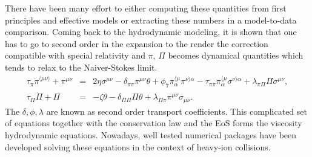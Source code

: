 There have been many effort to either computing these quantities from first principles and effective models or extracting these numbers in a model-to-data comparison.
Coming back to the hydrodynamic modeling, it is shown that one has to go to second order in the expansion to the render the correction compatible with special relativity and $\pi$, $\Pi$ becomes dynamical quantities which tends to relax to the Naiver-Stokes limit.
\begin{eqnarray}
\nonumber
\tau_\pi \dot{\pi}^{\langle\mu\nu\rangle}+\pi^{\mu\nu} &=& 2\eta\sigma^{\mu\nu}- \delta_{\pi\pi}\pi^{\mu\nu}\theta + \phi_7 \pi_{\alpha}^{\langle\mu}\pi^{\nu\rangle\alpha}-\tau_{\pi\pi}\pi_{\alpha}^{\langle\mu}\sigma^{\nu\rangle\alpha} + \lambda_{\pi\Pi}\Pi\sigma^{\mu\nu},
\\
\nonumber
\tau_{\Pi}\dot{\Pi} + \Pi &=& -\zeta\theta - \delta_{\Pi\Pi}\Pi\theta + \lambda_{\Pi\pi}\pi^{\mu\nu}\sigma_{\mu\nu}.
\end{eqnarray}
The $\delta, \phi, \lambda$ are known as second order transport coefficients.
This complicated set of equations together with the conservation law and the EoS forms the viscosity hydrodynamic equations.
Nowadays, well tested numerical packages have been developed solving these equations in the context of heavy-ion collisions.

